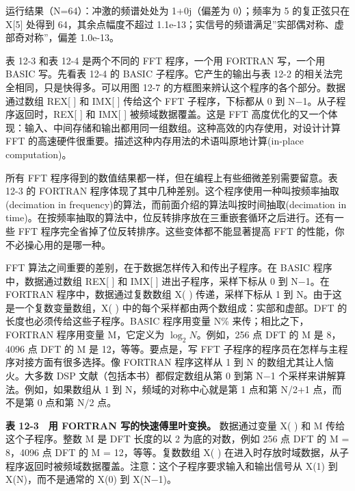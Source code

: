 运行结果（N=64）：冲激的频谱处处为 1+0j（偏差为 0）；频率为 5
的复正弦只在 X{[}5{]} 处得到 64，其余点幅度不超过
1.1e-13；实信号的频谱满足''实部偶对称、虚部奇对称''，偏差 1.0e-13。

表 12-3 和表 12-4 是两个不同的 FFT 程序，一个用 FORTRAN 写，一个用 BASIC
写。先看表 12-4 的 BASIC 子程序。它产生的输出与表 12-2
的相关法完全相同，只是快得多。可以用图 12-7
的方框图来辨认这个程序的各个部分。数据通过数组 REX{[} {]} 和 IMX{[} {]}
传给这个 FFT 子程序，下标都从 0 到 N−1。从子程序返回时，REX{[} {]} 和
IMX{[} {]} 被频域数据覆盖。这是 FFT
高度优化的又一个体现：输入、中间存储和输出都用同一组数组。这种高效的内存使用，对设计计算
FFT 的高速硬件很重要。描述这种内存用法的术语叫原地计算(in-place
computation)。

所有 FFT 程序得到的数值结果都一样，但在编程上有些细微差别需要留意。表
12-3 的 FORTRAN
程序体现了其中几种差别。这个程序使用一种叫按频率抽取(decimation in
frequency)的算法，而前面介绍的算法叫按时间抽取(decimation in
time)。在按频率抽取的算法中，位反转排序放在三重嵌套循环之后进行。还有一些
FFT 程序完全省掉了位反转排序。这些变体都不能显著提高 FFT
的性能，你不必操心用的是哪一种。

FFT 算法之间重要的差别，在于数据怎样传入和传出子程序。在 BASIC
程序中，数据通过数组 REX{[} {]} 和 IMX{[} {]} 进出子程序，采样下标从 0
到 N−1。在 FORTRAN 程序中，数据通过复数数组 X( ) 传递，采样下标从 1 到
N。由于这是一个复数变量数组，X( )
中的每个采样都由两个数组成：实部和虚部。DFT
的长度也必须传给这些子程序。BASIC 程序用变量 N\% 来传；相比之下，FORTRAN
程序用变量 M，它定义为 \(\log_2 N\)。例如，256 点 DFT 的 M 是 8，4096 点
DFT 的 M 是 12，等等。要点是，写 FFT
子程序的程序员在怎样与主程序对接方面有很多选择。像 FORTRAN 程序这样从 1
到 N 的数组尤其让人恼火。大多数 DSP 文献（包括本书）都假定数组从第 0
到第 N−1 个采样来讲解算法。例如，如果数组从 1 到 N，频域的对称中心就是第
1 点和第 N/2+1 点，而不是第 0 点和第 N/2 点。

\textbf{表 12-3　用 FORTRAN 写的快速傅里叶变换。} 数据通过变量 X( ) 和 M
传给这个子程序。整数 M 是 DFT 长度的以 2 为底的对数，例如 256 点 DFT 的
M = 8，4096 点 DFT 的 M = 12，等等。复数数组 X( )
在进入时存放时域数据，从子程序返回时被频域数据覆盖。注意：这个子程序要求输入和输出信号从
X(1) 到 X(N)，而不是通常的 X(0) 到 X(N−1)。

